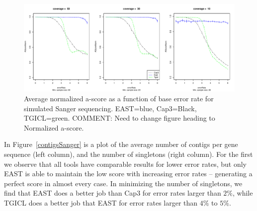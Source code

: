 \documentclass[10pt]{bmc_article}
\newcommand{\capthree} {{\small Cap3}}
\newcommand{\tgicl} {{\small TGICL}}
\newcommand{\east} {{\small EAST}}
\newenvironment{bmcformat}{\begin{raggedright}\baselineskip20pt\sloppy\setboolean{publ}{false}}{\end{raggedright}\baselineskip20pt\sloppy}
\begin{document}
\begin{bmcformat}
\begin{figure}[htb]
\centerline{\includegraphics[width=6in]{pics.d/ascore_sanger_norm.pdf}}
\caption{Average normalized a-score as a function of base error rate for
  simulated Sanger sequencing.  \east=blue, \capthree=Black,
  \tgicl=green. COMMENT: Need to change figure heading to Normalized a-score.}
\label{sangerAscore}
\end{figure}

In Figure~\ref{contigsSanger} is a
plot of the average number of contigs per gene sequence (left column), and
the number of singletons (right column).  For the first we observe that all tools have
comparable results for lower error rates, but only \east\/ is able to
maintain the low score with increasing error rates -- generating a
perfect score in almost every case.  In minimizing the
number of singletons, we find that \east\/ does a better job than
\capthree\/ for error rates larger than $2\%$, while \tgicl\/ does a
better job that \east\/ for error rates larger than $4\%$ to $5\%$.


\end{bmcformat}
\end{document}
